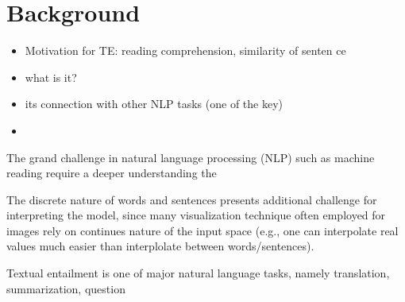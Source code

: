 

\section{Background}

\begin{itemize}
    \item Motivation for TE: reading comprehension, similarity of senten ce
    \item what is it?
    \item its connection with other NLP tasks (one of the key)
    \item
\end{itemize}

The grand challenge in natural language processing (NLP) such as
machine reading require a deeper understanding the


The discrete nature of words and sentences presents additional challenge for
interpreting the model, since many visualization technique often employed
for images rely on continues nature of the input space (e.g., one can interpolate
real values much easier than interplolate between words/sentences).
%




Textual entailment is one of major natural language tasks, namely translation, summarization, question

